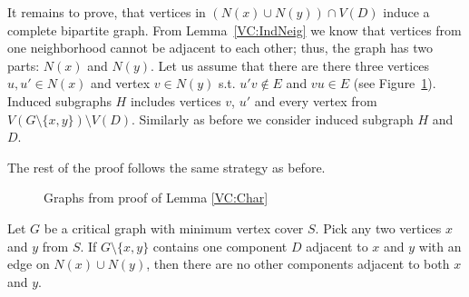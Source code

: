 \begin{myproof}
	It remains to prove, that vertices in \((N(x) \cup N(y)) \cap V(D)\) induce a complete bipartite graph.
	From Lemma~\ref{VC:IndNeig} we know that vertices from one neighborhood cannot 
	be adjacent to each other; thus, the graph has two parts: \(N(x)\) and \(N(y)\).
	Let us assume that there are there three vertices \(u, u' \in N(x)\) and vertex \(v \in N(y)\) s.t. \(u'v \not\in E\) and \(vu \in E\) (see Figure~\ref{pic:VCChar}).
	Induced subgraphs \(H\) includes vertices \(v\), \(u'\) and every vertex from \(V(G \setminus \{x, y\}) \setminus V(D)\).
	Similarly as before we consider induced subgraph \(H\) and \(D\).

	The rest of the proof follows the same strategy as before.
\end{myproof}

\begin{figure}
        \centering
        \begin{minipage}{.5\textwidth}
                \centering
                
                \caption*{}
        \end{minipage}%
        \begin{minipage}{.5\textwidth}
                \centering
                
		\caption*{}
        \end{minipage}
	\caption{Graphs from proof of Lemma \ref{VC:Char}}
	\label{pic:VCChar}
\end{figure}

\begin{lemma}\label{VC:1comp}
	Let \(G\) be a critical graph with minimum vertex cover \(S\).
	Pick any two vertices \(x\) and \(y\) from \(S\).
	If \(G \setminus \{x, y\}\) contains one component \(D\) adjacent to \(x\) and \(y\) with an edge on \(N(x) \cup N(y)\),
	then there are no other components adjacent to both \(x\) and \(y\).
\end{lemma}

